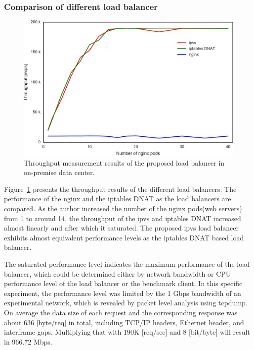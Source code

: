 \FloatBarrier

\subsubsection{Comparison of different load balancer}

\begin{figure}[h]
  \includegraphics[width=0.9\columnwidth]{Figs/ipvs-iptables-nginx}
  \caption{Throughput measurement results of the proposed load balancer in on-premise data center.}
  \label{fig:ipvs-iptables-nginx}
\end{figure}


Figure~\ref{fig:ipvs-iptables-nginx} presents the throughput results of the different load balancers.
The performance of the nginx and the iptables DNAT as the load balancers are compared.
As the author increased the number of the nginx pods(web servers) from 1 to around 14, the throughput of the ipvs and iptables DNAT increased almost linearly and after which it saturated.
The proposed ipvs load balancer exhibits almost equivalent performance levels as the iptables DNAT based load balancer.

The saturated performance level indicates the maximum performance of the load balancer, which could be determined either by network bandwidth or CPU performance level of the load balancer or the benchmark client.
In this specific experiment, the performance level was limited by the 1 Gbps bandwidth of an experimental network, which is revealed by packet level analysis using tcpdump\cite{takahashi2018portable}.
On average the data size of each request and the corresponding response was about 636 [byte/req] in total, including TCP/IP headers, Ethernet header, and interframe gaps.
Multiplying that with 190K [req/sec] and 8 [bit/byte] will result in 966.72 Mbps.

